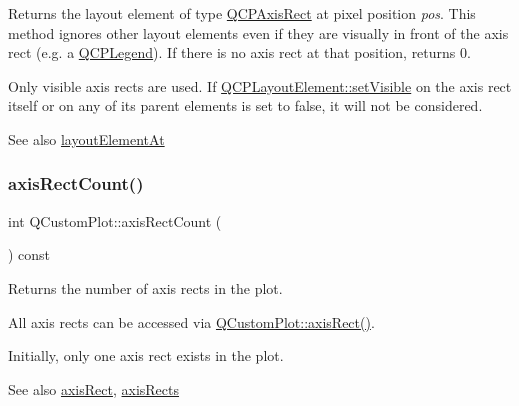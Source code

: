 Returns the layout element of type \mbox{\hyperlink{class_q_c_p_axis_rect}{Q\+C\+P\+Axis\+Rect}} at pixel position {\itshape pos}. This method ignores other layout elements even if they are visually in front of the axis rect (e.\+g. a \mbox{\hyperlink{class_q_c_p_legend}{Q\+C\+P\+Legend}}). If there is no axis rect at that position, returns 0.

Only visible axis rects are used. If \mbox{\hyperlink{class_q_c_p_layerable_a3bed99ddc396b48ce3ebfdc0418744f8}{Q\+C\+P\+Layout\+Element\+::set\+Visible}} on the axis rect itself or on any of its parent elements is set to false, it will not be considered.

\begin{DoxySeeAlso}{See also}
\mbox{\hyperlink{class_q_custom_plot_afaa1d304e0287d140fd238e90889ef3c}{layout\+Element\+At}} 
\end{DoxySeeAlso}
\mbox{\label{class_q_custom_plot_a8f85940aaac50efb466287d9d2d04ec6}} 
\subsubsection{\texorpdfstring{axis\+Rect\+Count()}{axisRectCount()}}
{\footnotesize\ttfamily int Q\+Custom\+Plot\+::axis\+Rect\+Count (\begin{DoxyParamCaption}{ }\end{DoxyParamCaption}) const}

Returns the number of axis rects in the plot.

All axis rects can be accessed via \mbox{\hyperlink{class_q_custom_plot_ae5eefcb5f6ca26689b1fd4f6e25b42f9}{Q\+Custom\+Plot\+::axis\+Rect()}}.

Initially, only one axis rect exists in the plot.

\begin{DoxySeeAlso}{See also}
\mbox{\hyperlink{class_q_custom_plot_ae5eefcb5f6ca26689b1fd4f6e25b42f9}{axis\+Rect}}, \mbox{\hyperlink{class_q_custom_plot_a12af771429e2d7e313c8c5d5fca068fe}{axis\+Rects}} 
\end{DoxySeeAlso}
\mbox{\label{class_q_custom_plot_a12af771429e2d7e313c8c5d5fca068fe}} 
